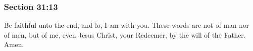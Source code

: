 	\subsubsection{Section 31:13} %
		\label{DC31-13}

		Be faithful unto the end, and lo, I am with you. These words are not of man nor of men, but of me, even Jesus Christ, your Redeemer, by the will of the Father. Amen.

